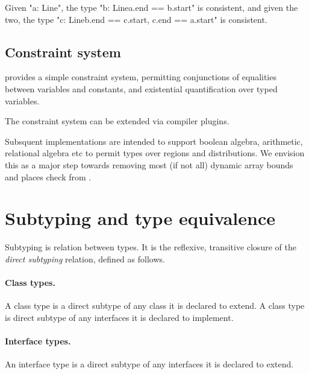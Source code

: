 Given \xcd"a: Line", the type \xcd"b: Line{a.end == b.start}" is consistent,
and
given the two, the type \xcd"c: Line{b.end == c.start, c.end == a.start}"
is consistent.


\subsection{Constraint system}

\Xten{} provides a simple constraint system,  
permitting conjunctions of equalities between variables and
constants, and existential quantification over typed variables.

The constraint system can be extended via compiler plugins.

Subsquent implementations are intended to support boolean algebra,
arithmetic, relational algebra etc to permit types over regions and
distributions. We envision this as a major step towards removing most
(if not all) dynamic array bounds and places check from \Xten{}.

\section{Subtyping and type equivalence}\label{DepType:Equivalence}\label{deptype,equivalence}

Subtyping is relation between types.  It is the
reflexive, transitive 
closure of the {\em direct subtyping} relation, defined as
follows.

\paragraph{Class types.}  A class type is a direct subtype of
any
class it is declared to extend.  A class type is direct subtype
of any interfaces it is declared to implement.

\paragraph{Interface types.}  An interface type is a direct
subtype of any interfaces it is declared to extend.

